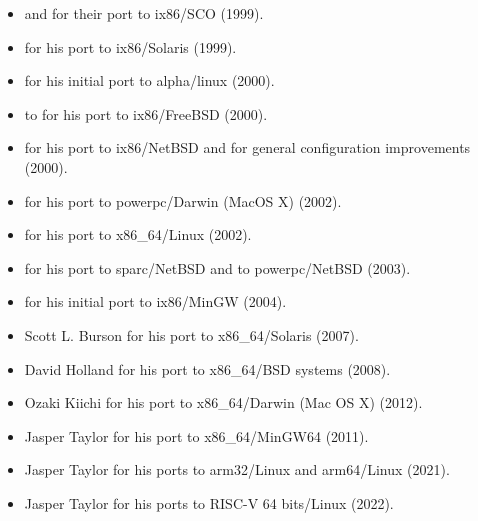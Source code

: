 \begin{itemize}

\item {} and
 for their port to
ix86/SCO (1999).

\item {} for
his port to ix86/Solaris (1999).

\item {} for his initial port to
alpha/linux (2000).

\item {} to for his port to
ix86/FreeBSD (2000).

\item {} for his port to
ix86/NetBSD and for general configuration improvements (2000).

\item {} for his port to
powerpc/Darwin (MacOS X) (2002).

\item {} for his port to
x86\_64/Linux (2002).

\item {} for his port to
sparc/NetBSD and to powerpc/NetBSD (2003).

\item {} for his initial port to
ix86/MinGW (2004).

\item {} {Scott L. Burson} for his port to x86\_64/Solaris (2007).

\item {} {David Holland} for his port to x86\_64/BSD systems (2008).

\item {} {Ozaki Kiichi} for his port to x86\_64/Darwin (Mac OS X) (2012).

\item {} {Jasper Taylor} for his port to x86\_64/MinGW64 (2011).

\item {} {Jasper Taylor} for his ports to arm32/Linux and arm64/Linux (2021).

\item {} {Jasper Taylor} for his ports to RISC-V 64 bits/Linux (2022).

\end{itemize}

